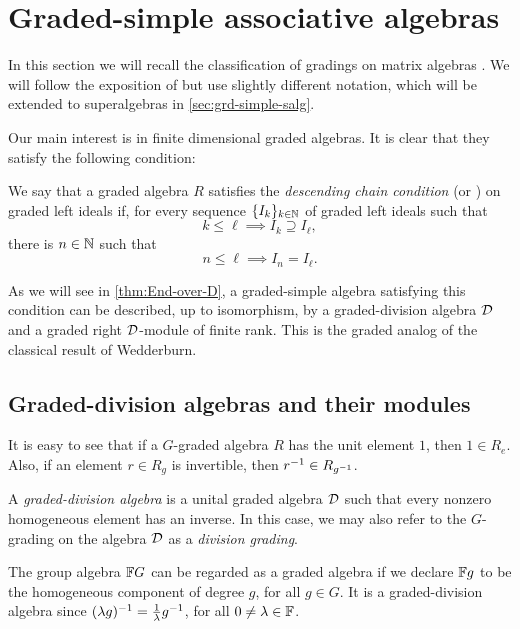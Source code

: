 
\section{Graded-simple associative algebras}\label{sec:gradings-on-matrix-algebras}

In this section we will recall the classification of gradings on matrix algebras \cite{BSZ01, BZ02, BK10}. 
We will follow the exposition of \cite[Chapter 2]{livromicha} but use slightly different notation, which will be extended to superalgebras in \cref{sec:grd-simple-salg}.

Our main interest is in finite dimensional graded algebras. 
It is clear that they satisfy the following condition:

\begin{defi}
    We say that a graded algebra $R$ satisfies the \emph{descending chain condition} (or \emph{\dcc}) on graded left ideals if, for every sequence $\{I_k\}_{k\in \mathbb{N}}$ of graded left ideals such that \[k \leq \ell \implies I_k \supseteq I_\ell,\] there is $n\in \mathbb{N}$ such that \[n \leq \ell \implies I_n = I_\ell.\]
\end{defi}

As we will see in \cref{thm:End-over-D}, a graded-simple algebra satisfying this condition can be described, up to isomorphism, by a graded-division algebra $\mathcal{D}$ and a graded right $\mathcal{D}$-module of finite rank. 
This is the graded analog of the classical result of Wedderburn.

\subsection{Graded-division algebras and their modules}\label{ssec:D-modules}

It is easy to see that if a $G$-graded algebra $R$ has the unit element $1$, then $1 \in R_e$. 
Also, if an element $r\in R_g$ is invertible, then $r^{-1} \in R_{g^{-1}}$.

\begin{defi}
    A \emph{graded-division algebra} is a unital graded algebra $\mathcal{D}$ such that every nonzero homogeneous element has an inverse. 
    In this case, we may also refer to the $G$-grading on the algebra $\mathcal{D}$ as a \emph{division grading}.
\end{defi}

\begin{ex}\label{ex:group-algebra}
    The group algebra $\mathbb{F} G$ can be regarded as a graded algebra if we declare $\mathbb{F} g$ to be the homogeneous component of degree $g$, for all $g\in G$. 
    It is a graded-division algebra since $(\lambda g)^{-1} = \frac1\lambda g^{-1}$, for all $0 \neq \lambda \in \mathbb{F}$.
\end{ex}

